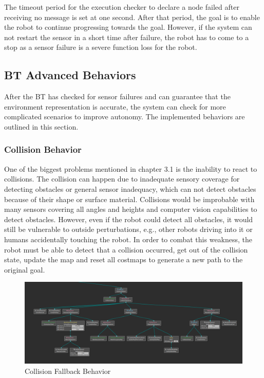 The timeout period for the execution checker to declare a node failed after receiving no message is set at one second. 
After that period, the goal is to enable the robot to continue progressing towards the goal. However, if the system can not restart the sensor in a short time after failure, the robot has to come to a stop as a sensor failure is a severe function loss for the robot.

\subsection{BT Advanced Behaviors}
After the BT has checked for sensor failures and can guarantee that the environment representation is accurate, the system can check for more complicated scenarios to improve autonomy. The implemented behaviors are outlined in this section. 


\subsubsection{Collision Behavior}

One of the biggest problems mentioned in chapter 3.1 is the inability to react to collisions. The collision can happen due to inadequate sensory coverage for detecting obstacles or general sensor inadequacy, which can not detect obstacles because of their shape or surface material. Collisions would be improbable with many sensors covering all angles and heights and computer vision capabilities to detect obstacles. However, even if the robot could detect all obstacles, it would still be vulnerable to outside perturbations, e.g., other robots driving into it or humans accidentally touching the robot. 
In order to combat this weakness, the robot must be able to detect that a collision occurred, get out of the collision state, update the map and reset all costmaps to generate a new path to the original goal. 

\begin{figure}[ht]
	\includegraphics[width=1.0\textwidth]{images/collision_fallback.png}
	\caption{Collision Fallback Behavior}
	\label{fig:collision_fallback}
\end{figure}

